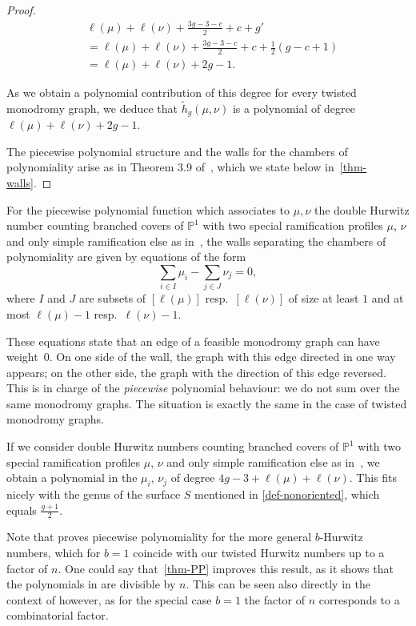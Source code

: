 \documentclass[ALCO,published]{cedram}
\begin{document}
\begin{proof}
\begin{align*}
&\ell(\mu)+\ell(\nu)+\frac{3g-3-c}{2}+c+g'
\\&= \ell(\mu)+\ell(\nu)+\frac{3g-3-c}{2}+c+\frac{1}{2}(g-c+1)
\\&= \ell(\mu)+\ell(\nu)+2g-1.
\end{align*}

As we obtain a polynomial contribution of this degree for every twisted monodromy graph, we deduce that $\tilde{h}_g(\mu,\nu)$ is a polynomial of degree $\ell(\mu)+\ell(\nu)+2g-1$. 

The piecewise polynomial structure and the walls for the chambers of polynomiality arise as in Theorem 3.9 of~\cite{CJM11}, which we state below in~\cref{thm-walls}.
\end{proof}

\begin{theo}\label{thm-walls}
For the piecewise polynomial function which associates to $\mu,\nu$ the double Hurwitz number counting branched covers of $\mathbb{P}^1$ with two special ramification profiles $\mu$, $\nu$ and only simple ramification else as in~\cite{GJV05, CJM11}, the walls separating the chambers  of polynomiality are given by equations of the form $$\sum_{i\in I} \mu_i - \sum_{j\in J} \nu_j=0,$$ where $I$ and $J$ are subsets of $[\ell(\mu)]$ resp.\ $[\ell(\nu)]$ of size at least $1$ and at most $\ell(\mu)-1$ resp.\ $\ell(\nu)-1$.
\end{theo}
These equations state that an edge of a feasible monodromy graph can have weight~$0$. On one side of the wall, the graph with this edge directed in one way appears; on the other side, the graph with the direction of this edge reversed. This is in charge of the \emph{piecewise} polynomial behaviour: we do not sum over the same monodromy graphs. The situation is exactly the same in the case of twisted monodromy graphs.

\begin{rema}
If we consider double Hurwitz numbers counting branched covers of $\mathbb{P}^1$ with two special ramification profiles $\mu$, $\nu$ and only simple ramification else as in~\cite{GJV05, CJM11}, we obtain a polynomial in the $\mu_i$, $\nu_j$ of degree $4g-3+\ell(\mu)+\ell(\nu)$.
This fits nicely with the genus of the surface $S$ mentioned in \cref{def-nonoriented}, which equals $\frac{g+1}{2}$.
\end{rema}

\begin{rema}
    Note that \cite[Theorem 6.6]{chapuy2020non} proves piecewise polynomiality for the more general $b$-Hurwitz numbers, which for $b=1$ coincide with our twisted Hurwitz numbers up to a factor of $n$. 
    One could say that~\cref{thm-PP} improves this result, as it shows that the polynomials in \cite[Theorem 6.6]{chapuy2020non} are divisible by $n$. This can be seen also directly in the context of \cite[Theorem 6.6]{chapuy2020non} however, as for the special case $b=1$ the factor of $n$ corresponds to a combinatorial factor.
\end{rema}
\end{document}
